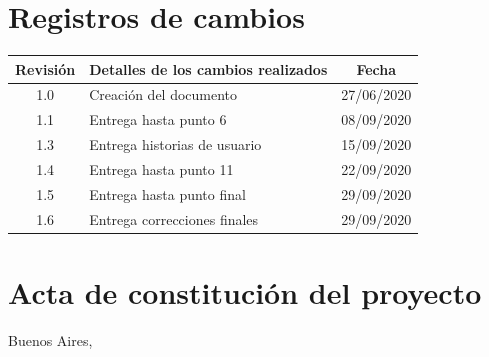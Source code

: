 \documentclass[11pt]{charter}
\begin{document}
\maketitle
\thispagestyle{empty}
\pagebreak


\thispagestyle{empty}
{\setlength{\parskip}{0pt}
\tableofcontents{}
}
\pagebreak


\section{Registros de cambios}
\label{sec:registro}


\begin{table}[ht]
\label{tab:registro}
\centering
\begin{tabularx}{\linewidth}{@{}|c|X|c|@{}}
\hline
\rowcolor[HTML]{C0C0C0} 
Revisión & \multicolumn{1}{c|}{\cellcolor[HTML]{C0C0C0}Detalles de los cambios realizados} & Fecha      \\ \hline
1.0      & Creación del documento                                          & 27/06/2020 \\ \hline
1.1      & Entrega hasta punto 6                                           & 08/09/2020 \\ \hline
1.3      & Entrega historias de usuario										& 15/09/2020    \\ \hline
1.4	     & Entrega hasta punto 11										& 22/09/2020    \\ \hline
1.5	     & Entrega hasta punto final										& 29/09/2020    \\ \hline
1.6	     & Entrega correcciones finales								& 29/09/2020    \\ \hline
\end{tabularx}
\end{table}

\pagebreak



\section{Acta de constitución del proyecto}
\label{sec:acta}

\begin{flushright}
Buenos Aires, \fechaInicioName
\end{flushright}
\end{document}
